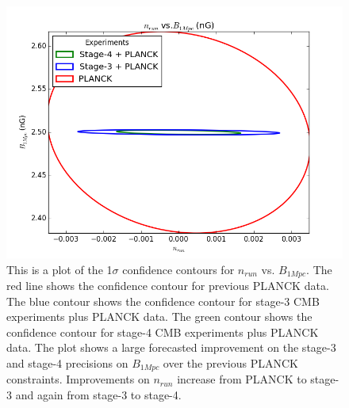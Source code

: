\begin{figure}[h]
\centering
\includegraphics[scale=0.85]{images/contours/nrun.png}
\caption{This is a plot of the 1$\sigma$ confidence contours for $n_{run}$ vs. $B_{1Mpc}$. The red line shows the confidence contour for previous PLANCK data. The blue contour shows the confidence contour for stage-3 CMB experiments plus PLANCK data. The green contour shows the confidence contour for stage-4 CMB experiments plus PLANCK data. The plot shows a large forecasted improvement on the stage-3 and stage-4 precisions on $B_{1Mpc}$ over the previous PLANCK constraints. Improvements on $n_{run}$ increase from PLANCK to stage-3 and again from stage-3 to stage-4.}
\label{fig:nrun}
\end{figure}


